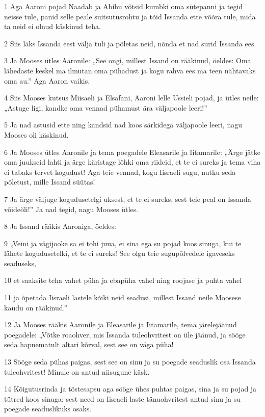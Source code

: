 \par 1 Aga Aaroni pojad Naadab ja Abihu võtsid kumbki oma sütepanni ja tegid neisse tule, panid selle peale suitsutusrohtu ja tõid Issanda ette võõra tule, mida ta neid ei olnud käskinud teha.
\par 2 Siis läks Issanda eest välja tuli ja põletas neid, nõnda et nad surid Issanda ees.
\par 3 Ja Mooses ütles Aaronile: „See ongi, millest Issand on rääkinud, öeldes: Oma lähedaste keskel ma ilmutan oma pühadust ja kogu rahva ees ma teen nähtavaks oma au.” Aga Aaron vaikis.
\par 4 Siis Mooses kutsus Miisaeli ja Elsafani, Aaroni lelle Ussieli pojad, ja ütles neile: „Astuge ligi, kandke oma vennad pühamust ära väljapoole leeri!”
\par 5 Ja nad astusid ette ning kandsid nad koos särkidega väljapoole leeri, nagu Mooses oli käskinud.
\par 6 Ja Mooses ütles Aaronile ja tema poegadele Eleasarile ja Iitamarile: „Ärge jätke oma juukseid lahti ja ärge käristage lõhki oma riideid, et te ei sureks ja tema viha ei tabaks tervet kogudust! Aga teie vennad, kogu Iisraeli sugu, nutku seda põletust, mille Issand süütas!
\par 7 Ja ärge väljuge kogudusetelgi uksest, et te ei sureks, sest teie peal on Issanda võideõli!” Ja nad tegid, nagu Mooses ütles.
\par 8 Ja Issand rääkis Aaroniga, öeldes:
\par 9 „Veini ja vägijooke sa ei tohi juua, ei sina ega su pojad koos sinuga, kui te lähete kogudusetelki, et te ei sureks! See olgu teie sugupõlvedele igaveseks seaduseks,
\par 10 et saaksite teha vahet püha ja ebapüha vahel ning roojase ja puhta vahel
\par 11 ja õpetada Iisraeli lastele kõiki neid seadusi, millest Issand neile Moosese kaudu on rääkinud.”
\par 12 Ja Mooses rääkis Aaronile ja Eleasarile ja Iitamarile, tema järelejäänud poegadele: „Võtke roaohver, mis Issanda tuleohvritest on üle jäänud, ja sööge seda hapnematult altari kõrval, sest see on väga püha!
\par 13 Sööge seda pühas paigas, sest see on sinu ja su poegade seaduslik osa Issanda tuleohvritest! Minule on antud niisugune käsk.
\par 14 Kõigutusrinda ja tõstesapsu aga sööge ühes puhtas paigas, sina ja su pojad ja tütred koos sinuga; sest need on Iisraeli laste tänuohvritest antud sinu ja su poegade seaduslikuks osaks.
